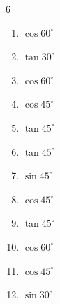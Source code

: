 \begin{multicols}{6}
\begin{enumerate}

  \item $\displaystyle \cos{60^\circ}$


  \item $\displaystyle \tan{30^\circ}$


  \item $\displaystyle \cos{60^\circ}$


  \item $\displaystyle \cos{45^\circ}$


\columnbreak %

\resetques

  \item $\displaystyle \tan{45^\circ}$

        \phantom{$\displaystyle =1$}

  \item $\displaystyle \tan{45^\circ}$

        \phantom{$\displaystyle =1$}

  \item $\displaystyle \sin{45^\circ}$


  \item $\displaystyle \cos{45^\circ}$


  \item $\displaystyle \tan{45^\circ}$

        \phantom{$\displaystyle =1$}

  \item $\displaystyle \cos{60^\circ}$


  \item $\displaystyle \cos{45^\circ}$


  \item $\displaystyle \sin{30^\circ}$


\end{enumerate}
\end{multicols}
